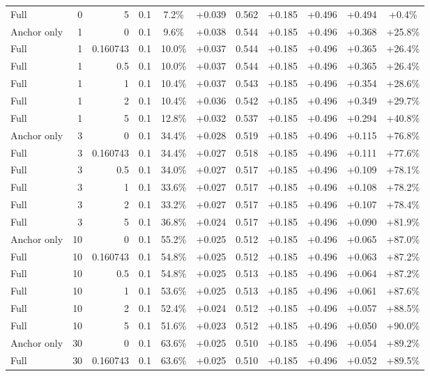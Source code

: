 \begin{table}[htbp]
\begin{tabular}{lrrrccccccc}
Full & 0 & 5 & 0.1 & 7.2\% & +0.039 & 0.562 & +0.185 & +0.496 & +0.494 & +0.4\% \\
Anchor only & 1 & 0 & 0.1 & 9.6\% & +0.038 & 0.544 & +0.185 & +0.496 & +0.368 & +25.8\% \\
Full & 1 & 0.160743 & 0.1 & 10.0\% & +0.037 & 0.544 & +0.185 & +0.496 & +0.365 & +26.4\% \\
Full & 1 & 0.5 & 0.1 & 10.0\% & +0.037 & 0.544 & +0.185 & +0.496 & +0.365 & +26.4\% \\
Full & 1 & 1 & 0.1 & 10.4\% & +0.037 & 0.543 & +0.185 & +0.496 & +0.354 & +28.6\% \\
Full & 1 & 2 & 0.1 & 10.4\% & +0.036 & 0.542 & +0.185 & +0.496 & +0.349 & +29.7\% \\
Full & 1 & 5 & 0.1 & 12.8\% & +0.032 & 0.537 & +0.185 & +0.496 & +0.294 & +40.8\% \\
Anchor only & 3 & 0 & 0.1 & 34.4\% & +0.028 & 0.519 & +0.185 & +0.496 & +0.115 & +76.8\% \\
Full & 3 & 0.160743 & 0.1 & 34.4\% & +0.027 & 0.518 & +0.185 & +0.496 & +0.111 & +77.6\% \\
Full & 3 & 0.5 & 0.1 & 34.0\% & +0.027 & 0.517 & +0.185 & +0.496 & +0.109 & +78.1\% \\
Full & 3 & 1 & 0.1 & 33.6\% & +0.027 & 0.517 & +0.185 & +0.496 & +0.108 & +78.2\% \\
Full & 3 & 2 & 0.1 & 33.2\% & +0.027 & 0.517 & +0.185 & +0.496 & +0.107 & +78.4\% \\
Full & 3 & 5 & 0.1 & 36.8\% & +0.024 & 0.517 & +0.185 & +0.496 & +0.090 & +81.9\% \\
Anchor only & 10 & 0 & 0.1 & 55.2\% & +0.025 & 0.512 & +0.185 & +0.496 & +0.065 & +87.0\% \\
Full & 10 & 0.160743 & 0.1 & 54.8\% & +0.025 & 0.512 & +0.185 & +0.496 & +0.063 & +87.2\% \\
Full & 10 & 0.5 & 0.1 & 54.8\% & +0.025 & 0.513 & +0.185 & +0.496 & +0.064 & +87.2\% \\
Full & 10 & 1 & 0.1 & 53.6\% & +0.025 & 0.513 & +0.185 & +0.496 & +0.061 & +87.6\% \\
Full & 10 & 2 & 0.1 & 52.4\% & +0.024 & 0.512 & +0.185 & +0.496 & +0.057 & +88.5\% \\
Full & 10 & 5 & 0.1 & 51.6\% & +0.023 & 0.512 & +0.185 & +0.496 & +0.050 & +90.0\% \\
Anchor only & 30 & 0 & 0.1 & 63.6\% & +0.025 & 0.510 & +0.185 & +0.496 & +0.054 & +89.2\% \\
Full & 30 & 0.160743 & 0.1 & 63.6\% & +0.025 & 0.510 & +0.185 & +0.496 & +0.052 & +89.5\% \\

\end{tabular}
\end{table}
